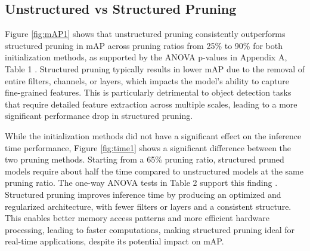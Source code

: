 \documentclass[10pt]{cai}
\begin{document}
\subsection{Unstructured vs Structured Pruning}
\label{sec2}
Figure \ref{fig:mAP1} shows that unstructured pruning consistently outperforms structured pruning in mAP across pruning ratios from 25\% to 90\% for both initialization methods, as supported by the ANOVA p-values in Appendix A, Table 1 \cite{MyAppendix}. Structured pruning typically results in lower mAP due to the removal of entire filters, channels, or layers, which impacts the model’s ability to capture fine-grained features. This is particularly detrimental to object detection tasks that require detailed feature extraction across multiple scales, leading to a more significant performance drop in structured pruning.

While the initialization methods did not have a significant effect on the inference time performance, Figure \ref{fig:time1} shows a significant difference between the two pruning methods. Starting from a 65\% pruning ratio, structured pruned models require about half the time compared to unstructured models at the same pruning ratio. The one-way ANOVA tests in Table 2 support this finding \cite{MyAppendix}. Structured pruning improves inference time by producing an optimized and regularized architecture, with fewer filters or layers and a consistent structure. This enables better memory access patterns and more efficient hardware processing, leading to faster computations, making structured pruning ideal for real-time applications, despite its potential impact on mAP.
\end{document}
